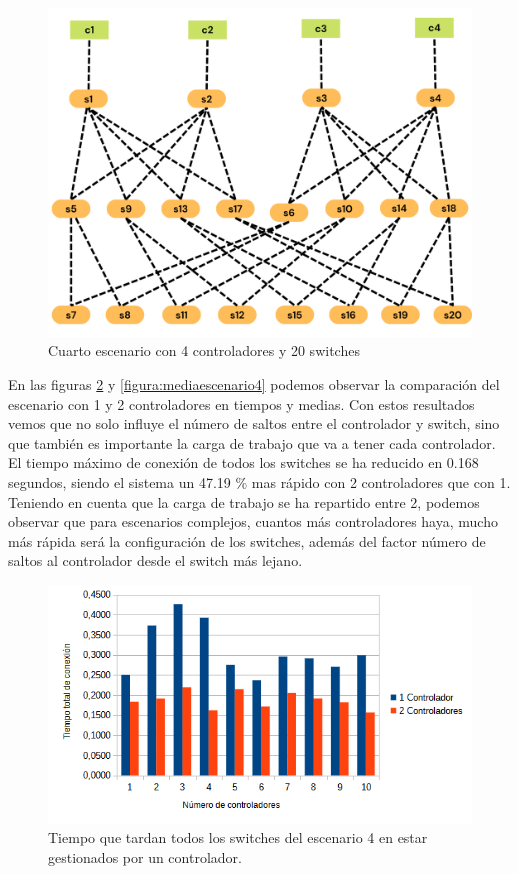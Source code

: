 \documentclass[a4paper, 12pt]{book}
\begin{document}
	
	\begin{figure}[H]
		\centering
		\includegraphics[width=13cm, keepaspectratio]{img/e4_3}
		\caption{Cuarto escenario con 4 controladores y 20 switches}
		\label{figura:e4_3}
	\end{figure}
	
En las figuras \ref{figura:comparativaescenario4} y \ref{figura:mediaescenario4} podemos observar la comparación del escenario con 1 y 2 controladores en tiempos y medias. Con estos resultados vemos que no solo influye el número de saltos entre el controlador y switch, sino que también es importante la carga de trabajo que va a tener cada controlador. El tiempo máximo de conexión de todos los switches se ha reducido en 0.168 segundos, siendo el sistema un 47.19 \% mas rápido con 2 controladores que con 1. Teniendo en cuenta que la carga de trabajo se ha repartido entre 2, podemos observar que para escenarios complejos, cuantos más controladores haya, mucho más rápida será la configuración de los switches, además del factor número de saltos al controlador desde el switch más lejano.
		
		
	
	
	\begin{figure}[H]
		\centering
		\includegraphics[width=13cm, keepaspectratio]{img/comparativaescenario4}
		\caption{Tiempo que tardan todos los switches del escenario 4 en estar gestionados por un controlador.}
		\label{figura:comparativaescenario4}
	\end{figure}
	
\end{document}
